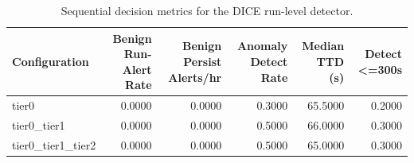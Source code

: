 \begin{table}[t]
\centering
\caption{Sequential decision metrics for the DICE run-level detector.}
\label{tab:dice_sequential_metrics}
\footnotesize
\begin{tabular}{lrrrrr}
\toprule
Configuration & Benign Run-Alert Rate & Benign Persist Alerts/hr & Anomaly Detect Rate & Median TTD (s) & Detect <=300s \\
\midrule
tier0 & 0.0000 & 0.0000 & 0.3000 & 65.5000 & 0.2000 \\
tier0_tier1 & 0.0000 & 0.0000 & 0.5000 & 66.0000 & 0.3000 \\
tier0_tier1_tier2 & 0.0000 & 0.0000 & 0.5000 & 65.0000 & 0.3000 \\
\bottomrule
\end{tabular}

\end{table}
